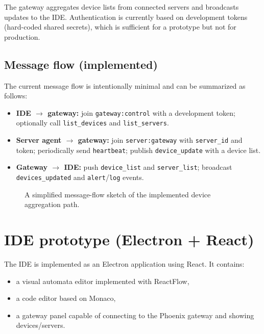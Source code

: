 The gateway aggregates device lists from connected servers and broadcasts updates to the IDE.
Authentication is currently based on development tokens (hard-coded shared secrets), which is sufficient for a prototype but not for production.

\subsection{Message flow (implemented)}

The current message flow is intentionally minimal and can be summarized as follows:
\begin{itemize}
  \item \textbf{IDE $\rightarrow$ gateway:} join \texttt{gateway:control} with a development token; optionally call \texttt{list\_devices} and \texttt{list\_servers}.
  \item \textbf{Server agent $\rightarrow$ gateway:} join \texttt{server:gateway} with \texttt{server\_id} and token; periodically send \texttt{heartbeat}; publish \texttt{device\_update} with a device list.
  \item \textbf{Gateway $\rightarrow$ IDE:} push \texttt{device\_list} and \texttt{server\_list}; broadcast \texttt{devices\_updated} and \texttt{alert}/\texttt{log} events.
\end{itemize}

\begin{figure}[h]
\centering
{}
\caption{A simplified message-flow sketch of the implemented device aggregation path.}
\end{figure}

\section{IDE prototype (Electron + React)}

The IDE is implemented as an Electron application using React.
It contains:
\begin{itemize}
  \item a visual automata editor implemented with ReactFlow,
  \item a code editor based on Monaco,
  \item a gateway panel capable of connecting to the Phoenix gateway and showing devices/servers.
\end{itemize}

